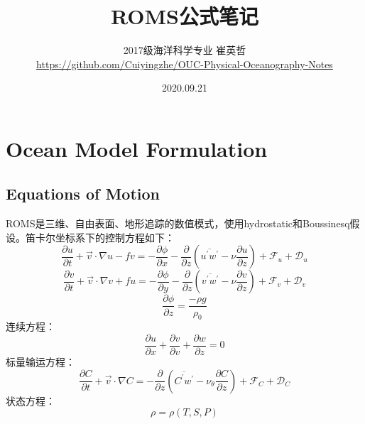 \documentclass[a3paper,12pt]{article}
\title{\heiti ROMS公式笔记}
\author{\small 2017级海洋科学专业 崔英哲 \\ \small \url{https://github.com/Cuiyingzhe/OUC-Physical-Oceanography-Notes}}
\date{\small 2020.09.21}
\newcommand*{\p}[2]{\frac{\partial #1}{\partial #2}}
\begin{document}
    \maketitle
    \renewcommand*\contentsname{}
    \tableofcontents
    \newpage
    \section{Ocean Model Formulation}
    \subsection{Equations of Motion}
    ROMS是三维、自由表面、地形追踪的数值模式，使用hydrostatic和Boussinesq假设。笛卡尔坐标系下的控制方程如下：
    \begin{equation}
        \frac{\partial u}{\partial t}+\vec{v} \cdot \nabla u-f v=-\frac{\partial \phi}{\partial x}-\frac{\partial}{\partial z}\left(\overline{u^{\prime} w^{\prime}}-\nu \frac{\partial u}{\partial z}\right)+\mathcal{F}_{u}+\mathcal{D}_{u}\label{1}
    \end{equation}
    \begin{equation}
        \frac{\partial v}{\partial t}+\vec{v} \cdot \nabla v+f u=-\frac{\partial \phi}{\partial y}-\frac{\partial}{\partial z}\left(\overline{v^{\prime} w^{\prime}}-\nu \frac{\partial v}{\partial z}\right)+\mathcal{F}_{v}+\mathcal{D}_{v}\label{2}
    \end{equation}
    \begin{equation}
        \frac{\partial \phi}{\partial z}=\frac{-\rho g}{\rho_0}\label{3}
    \end{equation}
    连续方程：
    \begin{equation}
        \p{u}{x}+\p{v}{v}+\p{w}{z}=0\label{4}
    \end{equation}
    标量输运方程：
    \begin{equation}
        \frac{\partial C}{\partial t}+\vec{v} \cdot \nabla C=-\frac{\partial}{\partial z}\left(\overline{C^{\prime} w^{\prime}}-\nu_{\theta} \frac{\partial C}{\partial z}\right)+\mathcal{F}_{C}+\mathcal{D}_{C}\label{5}
    \end{equation}
    状态方程：
    \begin{equation}
        \rho=\rho(T,S,P)\label{6}
    \end{equation} 
\end{document}
